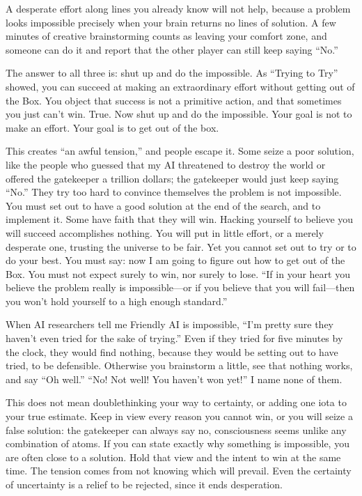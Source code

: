 A desperate effort along lines you already know will not help, because a problem looks impossible precisely when your brain returns no lines of solution. A few minutes of creative brainstorming counts as leaving your comfort zone, and someone can do it and report that the other player can still keep saying ``No.''

The answer to all three is: shut up and do the impossible. As ``Trying to Try'' showed, you can succeed at making an extraordinary effort without getting out of the Box. You object that success is not a primitive action, and that sometimes you just can't win. True. Now shut up and do the impossible. Your goal is not to make an effort. Your goal is to get out of the box.

This creates ``an awful tension,'' and people escape it. Some seize a poor solution, like the people who guessed that my AI threatened to destroy the world or offered the gatekeeper a trillion dollars; the gatekeeper would just keep saying ``No.'' They try too hard to convince themselves the problem is not impossible. You must set out to have a good solution at the end of the search, and to implement it. Some have faith that they will win. Hacking yourself to believe you will succeed accomplishes nothing. You will put in little effort, or a merely desperate one, trusting the universe to be fair. Yet you cannot set out to try or to do your best. You must say: now I am going to figure out how to get out of the Box. You must not expect surely to win, nor surely to lose. ``If in your heart you believe the problem really is impossible---or if you believe that you will fail---then you won't hold yourself to a high enough standard.'' 

When AI researchers tell me Friendly AI is impossible, ``I'm pretty sure they haven't even tried for the sake of trying.'' Even if they tried for five minutes by the clock, they would find nothing, because they would be setting out to have tried, to be defensible. Otherwise you brainstorm a little, see that nothing works, and say ``Oh well.'' ``No! Not well! You haven't won yet!'' I name none of them.

This does not mean doublethinking your way to certainty, or adding one iota to your true estimate. Keep in view every reason you cannot win, or you will seize a false solution: the gatekeeper can always say no, consciousness seems unlike any combination of atoms. If you can state exactly why something is impossible, you are often close to a solution. Hold that view and the intent to win at the same time. The tension comes from not knowing which will prevail. Even the certainty of uncertainty is a relief to be rejected, since it ends desperation.


